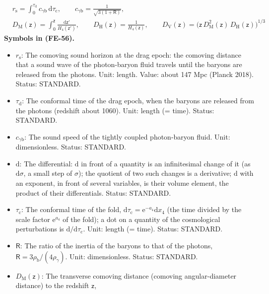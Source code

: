 \documentclass[
  10pt,
]{article}
\providecommand{\tightlist}{%
  \setlength{\itemsep}{0pt}\setlength{\parskip}{0pt}}
\begin{document}
\[
\begin{aligned}
&r_{\mathrm{s}} = \int_0^{\tau_{\mathrm{d}}}c_{\gamma\mathrm{b}}\,\mathrm{d}\tau_{\mathrm{c}},\qquad c_{\gamma\mathrm{b}} = \frac{1}{\sqrt{3(1 + \mathsf{R})}},\\
&D_{\mathrm{M}}(\mathsf{z}) = \int_0^{\mathsf{z}}\frac{\mathrm{d}\mathsf{z}'}{H_4(\mathsf{z}')},\qquad
 D_{\mathrm{H}}(\mathsf{z}) = \frac{1}{H_4(\mathsf{z})},\qquad
 D_{\mathrm{V}}(\mathsf{z}) = \big(\mathsf{z}\,D_{\mathrm{M}}^2(\mathsf{z})\,D_{\mathrm{H}}(\mathsf{z})\big)^{1/3}
\end{aligned} \tag{FE-56}
\] \textbf{Symbols in (FE-56).}

\begin{itemize}
\tightlist
\item
  \(r_{\mathrm{s}}\): The comoving sound horizon at the drag epoch: the
  comoving distance that a sound wave of the photon-baryon fluid travels
  until the baryons are released from the photons. Unit: length. Value:
  about 147 Mpc (Planck 2018). Status: STANDARD.
\item
  \(\tau_{\mathrm{d}}\): The conformal time of the drag epoch, when the
  baryons are released from the photons (redshift about 1060). Unit:
  length (= time). Status: STANDARD.
\item
  \(c_{\gamma\mathrm{b}}\): The sound speed of the tightly coupled
  photon-baryon fluid. Unit: dimensionless. Status: STANDARD.
\item
  \(\mathrm{d}\): The differential: \(\mathrm{d}\) in front of a
  quantity is an infinitesimal change of it (as \(\mathrm{d}\sigma\), a
  small step of \(\sigma\)); the quotient of two such changes is a
  derivative; \(\mathrm{d}\) with an exponent, in front of several
  variables, is their volume element, the product of their
  differentials. Status: STANDARD.
\item
  \(\tau_{\mathrm{c}}\): The conformal time of the fold,
  \(\mathrm{d}\tau_{\mathrm{c}} = \mathrm{e}^{-a_4}\mathrm{d}x_4\) (the
  time divided by the scale factor \(\mathrm{e}^{a_4}\) of the fold); a
  dot on a quantity of the cosmological perturbations is
  \(\mathrm{d}/\mathrm{d}\tau_{\mathrm{c}}\). Unit: length (= time).
  Status: STANDARD.
\item
  \(\mathsf{R}\): The ratio of the inertia of the baryons to that of the
  photons, \(\mathsf{R} = 3\rho_{\mathrm{b}}/(4\rho_\gamma)\). Unit:
  dimensionless. Status: STANDARD.
\item
  \(D_{\mathrm{M}}(\mathsf{z})\): The transverse comoving distance
  (comoving angular-diameter distance) to the redshift \(\mathsf{z}\),

\end{itemize}
\end{document}
